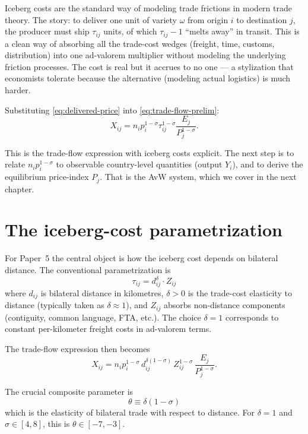 \documentclass[11pt,letterpaper,oneside]{book}
\theoremstyle{definition}
\theoremstyle{remark}
\begin{document}
Iceberg costs are the standard way of modeling trade frictions in modern trade theory. The story: to deliver one unit of variety $\omega$ from origin $i$ to destination $j$, the producer must ship $\tau_{ij}$ units, of which $\tau_{ij} - 1$ ``melts away'' in transit. This is a clean way of absorbing all the trade-cost wedges (freight, time, customs, distribution) into one ad-valorem multiplier without modeling the underlying friction processes. The cost is real but it accrues to no one --- a stylization that economists tolerate because the alternative (modeling actual logistics) is much harder.

Substituting \eqref{eq:delivered-price} into \eqref{eq:trade-flow-prelim}:
\begin{equation}
X_{ij} = n_i p_i^{1-\sigma} \tau_{ij}^{1-\sigma} \frac{E_j}{P_j^{1-\sigma}}.
\label{eq:trade-flow-with-iceberg}
\end{equation}

This is the trade-flow expression with iceberg costs explicit. The next step is to relate $n_i p_i^{1-\sigma}$ to observable country-level quantities (output $Y_i$), and to derive the equilibrium price-index $P_j$. That is the AvW system, which we cover in the next chapter.

\section{The iceberg-cost parametrization}

For Paper~5 the central object is how the iceberg cost depends on bilateral distance. The conventional parametrization is
\begin{equation}
\tau_{ij} = d_{ij}^{\delta} \cdot Z_{ij}
\label{eq:iceberg-parametrization}
\end{equation}
where $d_{ij}$ is bilateral distance in kilometres, $\delta > 0$ is the trade-cost elasticity to distance (typically taken as $\delta \approx 1$), and $Z_{ij}$ absorbs non-distance components (contiguity, common language, FTA, etc.). The choice $\delta = 1$ corresponds to constant per-kilometer freight costs in ad-valorem terms.

The trade-flow expression then becomes
\begin{equation}
X_{ij} = n_i p_i^{1-\sigma} \, d_{ij}^{\delta(1-\sigma)} \, Z_{ij}^{1-\sigma} \, \frac{E_j}{P_j^{1-\sigma}}.
\label{eq:trade-flow-with-distance}
\end{equation}

The crucial composite parameter is
\begin{equation}
\boxed{\theta \equiv \delta(1 - \sigma)}
\label{eq:theta-def}
\end{equation}
which is the elasticity of bilateral trade with respect to distance. For $\delta = 1$ and $\sigma \in [4, 8]$, this is $\theta \in [-7, -3]$.
\end{document}
